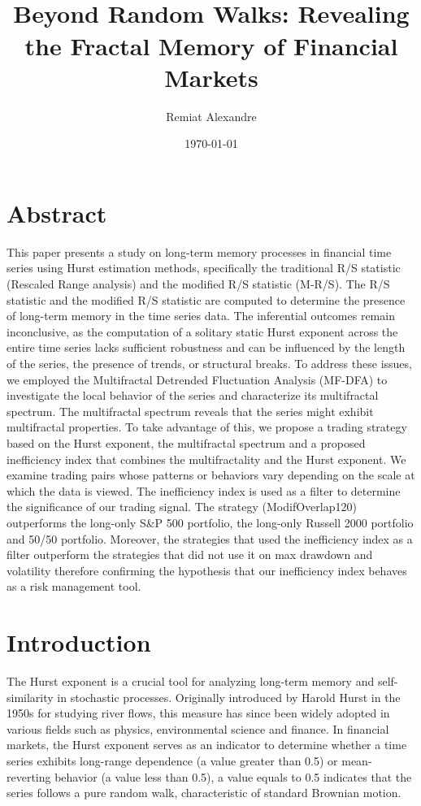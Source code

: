 \documentclass[11pt]{extarticle}
\title{
    \hspace*{-12cm}
    \vspace*{1cm}
    \protect\\
    \vspace*{1cm}
    \textbf{Beyond Random Walks: Revealing the Fractal Memory of Financial Markets}
}
\author{Remiat Alexandre}
\date{\today}
\begin{document}

\maketitle


\newpage


\section*{Abstract}

This paper presents a study on long-term memory processes in financial time series using Hurst estimation methods,
specifically the traditional R/S statistic (Rescaled Range analysis) and the modified R/S statistic (M-R/S).
The R/S statistic and the modified R/S statistic are computed to determine the presence of long-term memory in the time series data.
The inferential outcomes remain inconclusive, as the computation of a solitary static Hurst exponent
across the entire time series lacks sufficient robustness and can be influenced by the length of the series, the presence of trends, or structural breaks.
To address these issues, we employed the Multifractal Detrended Fluctuation Analysis (MF-DFA) to investigate the
local behavior of the series and characterize its multifractal spectrum. The multifractal spectrum reveals that the series
might exhibit multifractal properties. To take advantage of this, we propose a trading strategy based on the Hurst
exponent, the multifractal spectrum and a proposed inefficiency index that combines the multifractality and the Hurst exponent.
We examine trading pairs whose patterns or behaviors vary depending on the scale at which the data is viewed.
The inefficiency index is used as a filter to determine the significance of our trading signal.
The strategy (ModifOverlap120) outperforms the long-only S\&P 500 portfolio, the long-only Russell 2000 portfolio and
50/50 portfolio. Moreover, the strategies that used the inefficiency index as a filter
outperform the strategies that did not use it on max drawdown and volatility therefore confirming the hypothesis that our inefficiency index behaves as a risk management tool.



\newpage

\section{Introduction}

The Hurst exponent is a crucial tool for analyzing long-term memory and self-similarity in stochastic processes.
Originally introduced by Harold Hurst in the 1950s for studying river flows, this measure has since been widely
adopted in various fields such as physics, environmental science and finance. In financial markets, the Hurst
exponent serves as an indicator to determine whether a time series exhibits long-range dependence (a value greater
than 0.5) or mean-reverting behavior (a value less than 0.5), a value equals to 0.5 indicates that the series
follows a pure random walk, characteristic of standard Brownian motion.
\end{document}
